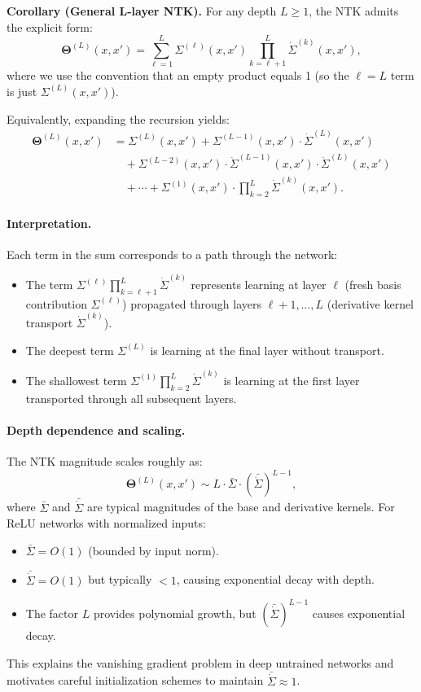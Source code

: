 \documentclass{article}
\newcommand{\Kop}{\boldsymbol{\Theta}}
\begin{document}
\medskip
\noindent\textbf{Corollary (General L-layer NTK).}
\label{cor:general_L_layer_ntk}
For any depth \( L \geq 1 \), the NTK admits the explicit form:
\begin{equation}
\label{eq:ntk_explicit_form}
\Kop^{(L)}(x,x') = \sum_{\ell=1}^{L} \Sigma^{(\ell)}(x,x') \prod_{k=\ell+1}^{L} \dot{\Sigma}^{(k)}(x,x'),
\end{equation}
where we use the convention that an empty product equals 1 (so the \( \ell=L \) term is just \( \Sigma^{(L)}(x,x') \)).

Equivalently, expanding the recursion yields:
\begin{align}
\Kop^{(L)}(x,x') &= \Sigma^{(L)}(x,x') + \Sigma^{(L-1)}(x,x')\cdot\dot{\Sigma}^{(L)}(x,x') \nonumber\\
&\quad + \Sigma^{(L-2)}(x,x')\cdot\dot{\Sigma}^{(L-1)}(x,x')\cdot\dot{\Sigma}^{(L)}(x,x') \nonumber\\
&\quad + \cdots + \Sigma^{(1)}(x,x')\cdot\prod_{k=2}^{L}\dot{\Sigma}^{(k)}(x,x').
\end{align}

\paragraph{Interpretation.}
Each term in the sum corresponds to a path through the network:
\begin{itemize}
    \item The term \( \Sigma^{(\ell)} \prod_{k=\ell+1}^L \dot{\Sigma}^{(k)} \) represents learning at layer \( \ell \) (fresh basis contribution \( \Sigma^{(\ell)} \)) propagated through layers \( \ell+1, \dots, L \) (derivative kernel transport \( \dot{\Sigma}^{(k)} \)).
    \item The deepest term \( \Sigma^{(L)} \) is learning at the final layer without transport.
    \item The shallowest term \( \Sigma^{(1)} \prod_{k=2}^L \dot{\Sigma}^{(k)} \) is learning at the first layer transported through all subsequent layers.
\end{itemize}

\paragraph{Depth dependence and scaling.}
The NTK magnitude scales roughly as:
\[
\Kop^{(L)}(x,x') \sim L \cdot \bar{\Sigma} \cdot (\bar{\dot{\Sigma}})^{L-1},
\]
where \( \bar{\Sigma} \) and \( \bar{\dot{\Sigma}} \) are typical magnitudes of the base and derivative kernels. For ReLU networks with normalized inputs:
\begin{itemize}
    \item \( \bar{\Sigma} = O(1) \) (bounded by input norm).
    \item \( \bar{\dot{\Sigma}} = O(1) \) but typically \( < 1 \), causing exponential decay with depth.
    \item The factor \( L \) provides polynomial growth, but \( (\bar{\dot{\Sigma}})^{L-1} \) causes exponential decay.
\end{itemize}
This explains the vanishing gradient problem in deep untrained networks and motivates careful initialization schemes to maintain \( \bar{\dot{\Sigma}} \approx 1 \).
\end{document}
